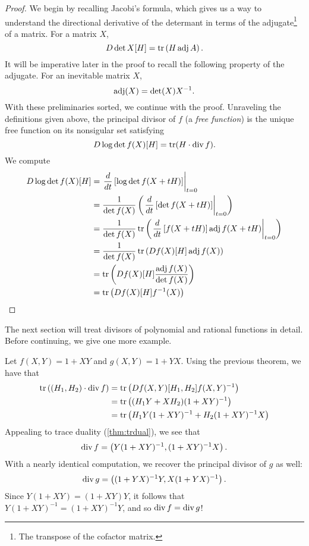 \begin{proof}
  We begin by recalling Jacobi's formula, which gives us a way to understand the
  directional derivative of the determant in terms of the adjugate\footnote{The
    transpose of the cofactor matrix.}
  of a matrix. For a matrix \(X\),
  \[
    D \det X [H] = \operatorname{tr} \left( H \operatorname{adj} A \right).
  \]
  It will be imperative later in the proof to recall the following property of
  the adjugate. For an inevitable matrix \(X\),
  \[
    \operatorname{adj} (X) = \det(X) X ^{-1}.
  \]
  With these preliminaries sorted, we continue with the proof.
  Unraveling the definitions given above, the principal divisor of \(f\) (a
  \emph{free function}) is the unique free function on its nonsigular set satisfying
  \[
    D \log \det f (X)[H] = \operatorname{tr} (H \cdot \operatorname{div} f).
  \]
  We compute
  \begin{align*}
    D \log \det f(X)[H] &=\left. \frac{d}{dt} \left[\log \det f(X+tH) \right]\right|_{t=0} \\
                        &= \frac{1}{\det f(X)} \left(\left. \frac{d}{dt} \left[ \det f(X+tH)\right]\right|_{t=0}\right)\\
                        &= \frac{1}{\det f(X)} \operatorname{tr}\left(\left. \frac{d}{dt} \left[ f(X+tH)\right] \operatorname{adj} f(X+tH)\right|_{t=0}\right)\\
                        &= \frac{1}{\det f(X)} \operatorname{tr}\left(Df(X)[H] \operatorname{adj} f(X)\right)\\
                        &= \operatorname{tr} \left( Df(X)[H] \frac{\operatorname{adj} f(X)}{\det f(X)}\right) \\
                        &= \operatorname{tr} \left( Df(X)[H] f ^{-1}(X) \right)
  \end{align*}
\end{proof}

The next section will treat divisors of polynomial and rational functions in
detail. Before continuing, we give one more example.

\begin{example}
  Let \(f(X,Y) = 1+XY\) and \(g(X,Y) =1+YX\). Using the previous theorem, we
  have that
  \begin{align*}
    \operatorname{tr} \left( (H_1,H_2) \cdot \operatorname{div} f \right)
      &= \operatorname{tr} \left(Df(X,Y)[H_1,H_2] f(X,Y) ^{-1}\right)\\
      &= \operatorname{tr} \left( (H_1Y + X H_2) (1+XY) ^{-1}\right) \\
      &= \operatorname{tr} \left( H_1Y(1+XY)^{-1} + H_2(1+XY)^{-1}X \right)
  \end{align*}
  Appealing to trace duality (\cref{thm:trdual}), we see that
  \[
    \operatorname{div} f = \left( Y(1+XY)^{-1},(1+XY)^{-1}X \right).
  \]
  With a nearly identical computation, we recover the principal divisor of \(g\)
  as well:
  \[
    \operatorname{div} g  = \left( (1+YX)^{-1}Y,X(1+YX)^{-1} \right).
  \]
  Since \(Y(1+XY)=(1+XY)Y\), it follows that
  \(Y(1+XY)^{-1}= (1+XY) ^{-1}Y\), and so \(\operatorname{div} f = \operatorname{div} g\)!
\end{example}

